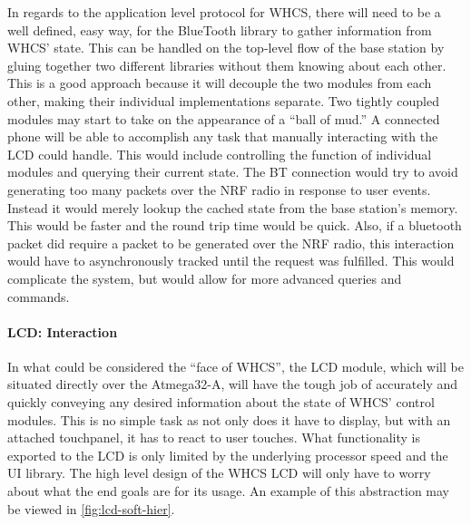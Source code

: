 In regards to the application level protocol for WHCS, there will need to be a
well defined, easy way, for the BlueTooth library to gather information from
WHCS' state. This can be handled on the top-level flow of the base station by
gluing together two different libraries without them knowing about each other.
This is a good approach because it will decouple the two modules from each
other, making their individual implementations separate. Two tightly coupled
modules may start to take on the appearance of a ``ball of mud.'' A connected
phone will be able to accomplish any task that manually interacting with the
LCD could handle. This would include controlling the function of individual
modules and querying their current state. The BT connection would try to avoid
generating too many packets over the NRF radio in response to user events.
Instead it would merely lookup the cached state from the base station's memory.
This would be faster and the round trip time would be quick. Also, if a
bluetooth packet did require a packet to be generated over the NRF radio, this
interaction would have to asynchronously tracked until the request was
fulfilled. This would complicate the system, but would allow for more advanced
queries and commands.

\paragraph{LCD: Interaction}
In what could be considered the ``face of WHCS'', the LCD module, which will be
situated directly over the Atmega32-A, will have the tough job of accurately
and quickly conveying any desired information about the state of WHCS' control
modules. This is no simple task as not only does it have to display, but with
an attached touchpanel, it has to react to user touches. What functionality is
exported to the LCD is only limited by the underlying processor speed and the
UI library. The high level design of the WHCS LCD will only have to worry about
what the end goals are for its usage. An example of this abstraction may be
viewed in \autoref{fig:lcd-soft-hier}.


